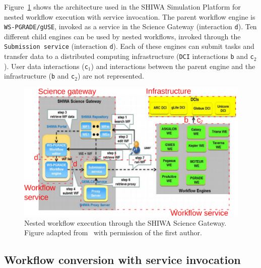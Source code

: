 \documentclass[preprint,3p,twocolumn]{elsarticle}
\begin{document}
{Figure~\ref{fig:shiwa-architecture} shows the architecture used in the
SHIWA Simulation Platform for nested workflow execution with service
invocation. The parent workflow engine is \texttt{WS-PGRADE/gUSE},
invoked as a service in the Science Gateway (interaction
\texttt{d}). Ten different child engines can be used by nested
workflows, invoked through the \texttt{Submission service}
(interaction \texttt{d}). Each of these engines can submit tasks and
transfer data to a distributed computing infrastructure (\texttt{DCI}
interactions \texttt{b} and \texttt{c$_2$}). User data interactions
(\texttt{c$_1$}) and interactions between the parent engine and the
infrastructure (\texttt{b} and \texttt{c$_2$}) are not represented.
\begin{figure}
\centering
\includegraphics[width=1.5\columnwidth]{figures/shiwa-science-gateway.png}
\caption{Nested workflow execution through the SHIWA Science Gateway. Figure
  adapted from~\cite{terstyanszky2014enabling} with permission of
  the first author.}
\label{fig:shiwa-architecture}
\end{figure}


\subsection{Workflow conversion with service invocation}

}
\end{document}
